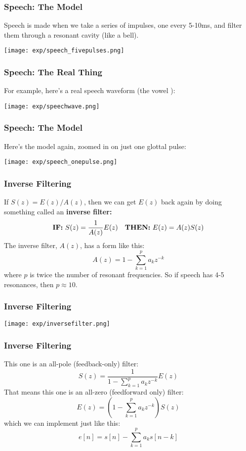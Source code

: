 \documentclass{beamer}
\newcommand{\ipa}[1]{\textipa{#1}}
\begin{document}
\begin{frame}
  \frametitle{Speech: The Model}

  Speech is made when we take a series of impulses, one every 5-10ms,
  and filter them through a resonant cavity (like a bell).

  \centerline{\texttt{[image: exp/speech\_fivepulses.png]}}
\end{frame}

\begin{frame}
  \frametitle{Speech: The Real Thing}
  For example, here's a real speech waveform (the vowel \ipa{/o/}):
  
  \centerline{\texttt{[image: exp/speechwave.png]}}
\end{frame}

\begin{frame}
  \frametitle{Speech: The Model}

  Here's the model again, zoomed in on just one glottal pulse:
  \centerline{\texttt{[image: exp/speech\_onepulse.png]}}
\end{frame}

\begin{frame}
  \frametitle{Inverse Filtering}

  If $S(z) = E(z)/A(z)$, then we can get $E(z)$ back again by doing
  something called an {\bf inverse filter:}
  \begin{displaymath}
    \mbox{\bf IF:}~S(z) = \frac{1}{A(z)}E(z)~~~
    \mbox{\bf THEN:}~E(z) = A(z)S(z)
  \end{displaymath}
  The inverse filter, $A(z)$, has a form like this:
  \begin{displaymath}
    A(z)  = 1 - \sum_{k=1}^p a_k z^{-k}
  \end{displaymath}
  where $p$ is twice the number of resonant frequencies.  So if
  speech has 4-5 resonances, then $p\approx 10$.
\end{frame}

\begin{frame}
  \frametitle{Inverse Filtering}

  \centerline{\texttt{[image: exp/inversefilter.png]}}
\end{frame}

\begin{frame}
  \frametitle{Inverse Filtering}

  This one is an all-pole (feedback-only) filter:
  \begin{displaymath}
    S(z) = \frac{1}{1-\sum_{k=1}^p a_kz^{-k}} E(z)
  \end{displaymath}
  That means this one is an all-zero (feedforward only) filter:
  \begin{displaymath}
    E(z) = \left(1-\sum_{k=1}^p a_kz^{-k}\right) S(z)
  \end{displaymath}
  which we can implement just like this:
  \begin{displaymath}
    e[n] = s[n] - \sum_{k=1}^p a_k s[n-k]
  \end{displaymath}
\end{frame}
\end{document}
